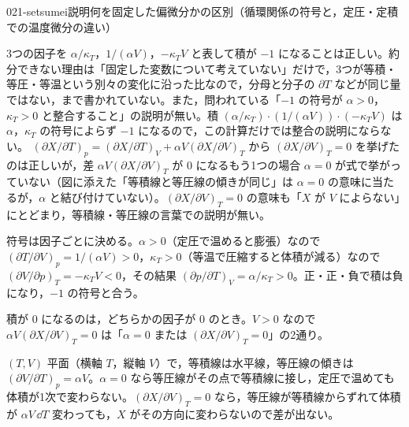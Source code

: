 \documentclass[uplatex,dvipdfmx,a4paper,11pt]{jsarticle}
\begin{document}
\begin{mondai}{021-setsumei}{説明}{何を固定した偏微分かの区別（循環関係の符号と，定圧・定積での温度微分の違い）}
\begin{kotaeran}
   3つの因子を $\alpha/\kappa_{T}$，$1/(\alpha V)$，$-\kappa_{T}V$ と表して積が $-1$ になることは正しい。約分できない理由は「固定した変数について考えていない」だけで，3つが等積・等圧・等温という別々の変化に沿った比なので，分母と分子の $\partial T$ などが同じ量ではない，まで書かれていない。また，問われている「$-1$ の符号が $\alpha>0$，$\kappa_{T}>0$ と整合すること」の説明が無い。積 $(\alpha/\kappa_{T})\cdot(1/(\alpha V))\cdot(-\kappa_{T}V)$ は $\alpha$，$\kappa_{T}$ の符号によらず $-1$ になるので，この計算だけでは整合の説明にならない。
   $(\partial X/\partial T)_{p}=(\partial X/\partial T)_{V}+\alpha V(\partial X/\partial V)_{T}$ から $(\partial X/\partial V)_{T}=0$ を挙げたのは正しいが，差 $\alpha V(\partial X/\partial V)_{T}$ が 0 になるもう1つの場合 $\alpha=0$ が式で挙がっていない（図に添えた「等積線と等圧線の傾きが同じ」は $\alpha=0$ の意味に当たるが，$\alpha$ と結び付けていない）。$(\partial X/\partial V)_{T}=0$ の意味も「$X$ が $V$ によらない」にとどまり，等積線・等圧線の言葉での説明が無い。
\end{kotaeran}
\begin{rikai}
  \item 符号は因子ごとに決める。$\alpha>0$（定圧で温めると膨張）なので $(\partial T/\partial V)_{p}=1/(\alpha V)>0$，$\kappa_{T}>0$（等温で圧縮すると体積が減る）なので $(\partial V/\partial p)_{T}=-\kappa_{T}V<0$，その結果 $(\partial p/\partial T)_{V}=\alpha/\kappa_{T}>0$。正・正・負で積は負になり，$-1$ の符号と合う。
  \item 積が 0 になるのは，どちらかの因子が 0 のとき。$V>0$ なので $\alpha V(\partial X/\partial V)_{T}=0$ は「$\alpha=0$ または $(\partial X/\partial V)_{T}=0$」の2通り。
  \item $(T,V)$ 平面（横軸 $T$，縦軸 $V$）で，等積線は水平線，等圧線の傾きは $(\partial V/\partial T)_{p}=\alpha V$。$\alpha=0$ なら等圧線がその点で等積線に接し，定圧で温めても体積が1次で変わらない。$(\partial X/\partial V)_{T}=0$ なら，等圧線が等積線からずれて体積が $\alpha V\,\dd T$ 変わっても，$X$ がその方向に変わらないので差が出ない。
\end{rikai}
\end{mondai}
\end{document}
